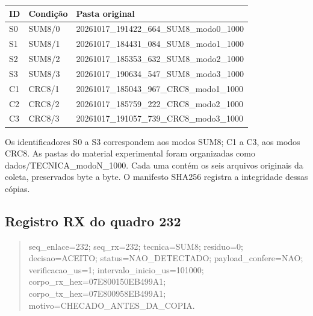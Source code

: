 \documentclass[12pt,a4paper]{article}
\begin{document}
\par\smallskip\noindent\begin{minipage}{\textwidth}\centering\small
{}
\begin{tabularx}{\textwidth}{@{}l l Y@{}}\toprule
\textbf{ID} & \textbf{Condição} & \textbf{Pasta original}\\\midrule
S0 & SUM8/0 & 20261017\_191422\_664\_SUM8\_modo0\_1000\\
S1 & SUM8/1 & 20261017\_184431\_084\_SUM8\_modo1\_1000\\
S2 & SUM8/2 & 20261017\_185353\_632\_SUM8\_modo2\_1000\\
S3 & SUM8/3 & 20261017\_190634\_547\_SUM8\_modo3\_1000\\
C1 & CRC8/1 & 20261017\_185043\_967\_CRC8\_modo1\_1000\\
C2 & CRC8/2 & 20261017\_185759\_222\_CRC8\_modo2\_1000\\
C3 & CRC8/3 & 20261017\_191057\_739\_CRC8\_modo3\_1000\\
\bottomrule\end{tabularx}
\par{}\end{minipage}\par\smallskip

Os identificadores S0 a S3 correspondem aos modos SUM8; C1 a C3, aos modos CRC8. As pastas do material experimental foram organizadas como dados/TECNICA\_modoN\_1000. Cada uma contém os seis arquivos originais da coleta, preservados byte a byte. O manifesto SHA256 registra a integridade dessas cópias.

\subsection{Registro RX do quadro 232}
\begin{quote}\small\ttfamily\raggedright seq\_enlace=232; seq\_rx=232; tecnica=SUM8; residuo=0;\\
decisao=ACEITO; status=NAO\_DETECTADO; payload\_confere=NAO;\\
verificacao\_us=1; intervalo\_inicio\_us=101000;\\
corpo\_rx\_hex=07E800150EB499A1;\\
corpo\_tx\_hex=07E800958EB499A1;\\
motivo=CHECADO\_ANTES\_DA\_COPIA.\end{quote}
\end{document}
